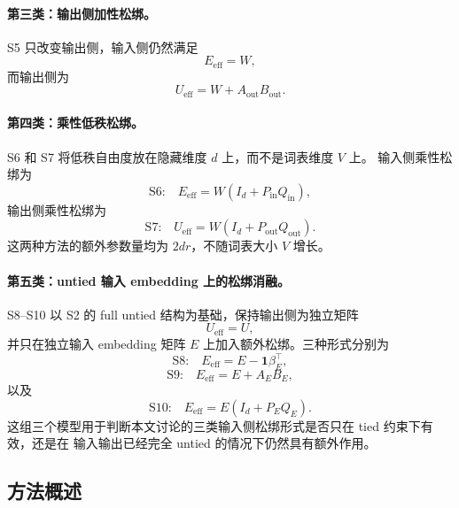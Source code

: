 \paragraph{第三类：输出侧加性松绑。}
S5 只改变输出侧，输入侧仍然满足
\begin{equation}
    E_{\mathrm{eff}} = W,
\end{equation}
而输出侧为
\begin{equation}
    U_{\mathrm{eff}} = W+A_{\mathrm{out}}B_{\mathrm{out}}.
\end{equation}

\paragraph{第四类：乘性低秩松绑。}
S6 和 S7 将低秩自由度放在隐藏维度 $d$ 上，而不是词表维度 $V$ 上。
输入侧乘性松绑为
\begin{equation}
    \text{S6:}\quad
    E_{\mathrm{eff}} = W(I_d+P_{\mathrm{in}}Q_{\mathrm{in}}),
\end{equation}
输出侧乘性松绑为
\begin{equation}
    \text{S7:}\quad
    U_{\mathrm{eff}} = W(I_d+P_{\mathrm{out}}Q_{\mathrm{out}}).
\end{equation}
这两种方法的额外参数量均为 $2dr$，不随词表大小 $V$ 增长。

\paragraph{第五类：untied 输入 embedding 上的松绑消融。}
S8--S10 以 S2 的 full untied 结构为基础，保持输出侧为独立矩阵
\begin{equation}
    U_{\mathrm{eff}} = U,
\end{equation}
并只在独立输入 embedding 矩阵 $E$ 上加入额外松绑。三种形式分别为
\begin{equation}
    \text{S8:}\quad
    E_{\mathrm{eff}} = E-\mathbf{1}\beta_E^\top,
\end{equation}
\begin{equation}
    \text{S9:}\quad
    E_{\mathrm{eff}} = E+A_EB_E,
\end{equation}
以及
\begin{equation}
    \text{S10:}\quad
    E_{\mathrm{eff}} = E(I_d+P_EQ_E).
\end{equation}
这组三个模型用于判断本文讨论的三类输入侧松绑形式是否只在 tied 约束下有效，还是在
输入输出已经完全 untied 的情况下仍然具有额外作用。

\subsection{方法概述}

